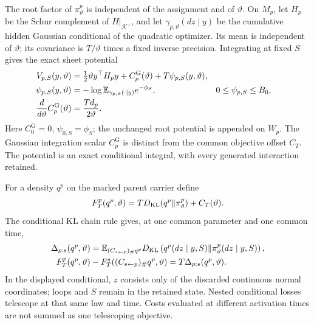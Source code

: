 The root factor of \(\pi_\vartheta^p\) is independent of the assignment
and of \(\vartheta\). On \(M_p\), let \(H_p\) be the Schur complement
of \(H|_{\mathcal K^\perp}\), and let
\(\gamma_{p,\vartheta}(dz\mid y)\) be the cumulative hidden Gaussian
conditional of the quadratic optimizer. Its mean is independent of
\(\vartheta\); its covariance is \(T/\vartheta\) times a fixed
inverse precision. Integrating at fixed \(S\) gives the exact sheet
potential
\begin{equation}
\begin{aligned}
V_{p,S}(y,\vartheta)
 &=\tfrac12\vartheta y^\top H_py+C_p^{\mathrm G}(\vartheta)
       +T\psi_{p,S}(y,\vartheta),\\
\psi_{p,S}(y,\vartheta)
 &=-\log\mathbb E_{\gamma_{p,\vartheta}(\cdot\mid y)}
                  e^{-\phi_S},&
0&\le\psi_{p,S}\le B_0,\\
\frac{d}{d\vartheta}C_p^{\mathrm G}(\vartheta)
 &=\frac{Td_p}{2\vartheta}.
\end{aligned}
\label{eq:rg-formation-parent-potential}
\end{equation}
Here \(C_0^{\mathrm G}=0\), \(\psi_{0,S}=\phi_S\); the unchanged
root potential is appended on \(W_p\).
The Gaussian integration scalar \(C_p^{\mathrm G}\) is distinct from
the common objective offset \(C_T\). The potential is an exact
conditional integral, with every generated interaction retained.

For a density \(q^p\) on the marked parent carrier define
\begin{equation}
F_T^p(q^p,\vartheta)
  =TD_{\mathrm{KL}}(q^p\Vert\pi_\vartheta^p)+C_T(\vartheta).
\label{eq:rg-formation-parent-vfe}
\end{equation}
The conditional KL chain rule gives, at one common parameter and one
common time,
\begin{equation}
\begin{aligned}
\Delta_{p:s}(q^p,\vartheta)
 &=\mathbb E_{(C_{s\leftarrow p})_\#q^p}
   D_{\mathrm{KL}}\left(q^p(dz\mid y,S)
        \middle\Vert\pi_\vartheta^p(dz\mid y,S)\right),\\
F_T^p(q^p,\vartheta)
 &-F_T^s((C_{s\leftarrow p})_\#q^p,\vartheta)
   =T\Delta_{p:s}(q^p,\vartheta).
\end{aligned}
\label{eq:rg-formation-conditional-cost}
\end{equation}
In the displayed conditional, \(z\) consists only of the discarded
continuous normal coordinates; loops and \(S\) remain in the retained
state. Nested conditional losses telescope at that same law and time.
Costs evaluated at different activation times are not summed as one
telescoping objective. 

